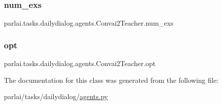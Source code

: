 \subsubsection{\texorpdfstring{num\+\_\+exs}{num\_exs}}
{\footnotesize\ttfamily parlai.\+tasks.\+dailydialog.\+agents.\+Convai2\+Teacher.\+num\+\_\+exs}

\mbox{\label{classparlai_1_1tasks_1_1dailydialog_1_1agents_1_1Convai2Teacher_a371a92d402235c804fcfc06d57272e1d}} 
\subsubsection{\texorpdfstring{opt}{opt}}
{\footnotesize\ttfamily parlai.\+tasks.\+dailydialog.\+agents.\+Convai2\+Teacher.\+opt}



The documentation for this class was generated from the following file\+:\begin{DoxyCompactItemize}
\item 
parlai/tasks/dailydialog/\hyperlink{parlai_2tasks_2dailydialog_2agents_8py}{agents.\+py}\end{DoxyCompactItemize}
